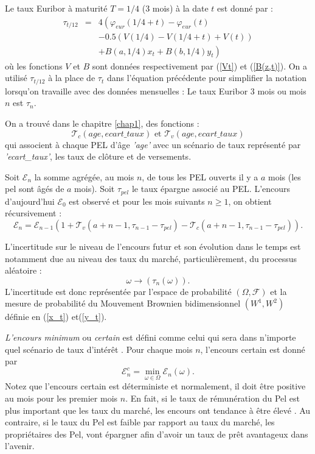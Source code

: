 \documentclass[12pt, a4paper]{book}
\newcommand{\Tc}{\mathcal{T}_c}
\newcommand{\Tv}{\mathcal{T}_v}
\newcommand{\E}{\mathcal{E}}
\begin{document}
Le taux Euribor à maturité $T =1/4$ (3 mois) à la date $t$ est donné par :
\begin{eqnarray}
\tau_{t/12} &=& 4\left( \varphi_{eur}(1/4+t)-\varphi_{eur}(t)\right.\nonumber\\
& &-0.5(V(1/4)-V(1/4+t)+V(t))\nonumber\\
& &\left.+B(a, 1/4)x_t + B(b, 1/4)y_t\right)\label{t_euribor}
\end{eqnarray}
où les fonctions $V$ et $B$ sont données respectivement par (\ref{Vt}) et (\ref{B(z,t)}). On a utilisé $\tau_{t/12}$ à la place de $\tau_t$ dans l'équation précédente pour simplifier la notation lorsqu'on travaille avec des données mensuelles : Le taux Euribor 3 mois ou mois $n$ est $\tau_n$.

On a trouvé dans le chapitre \ref{chap1}, des fonctions :
$$ \Tc(age, ecart\_taux)\mbox{ et }\Tv(age, ecart\_taux)$$
qui associent à chaque PEL d'âge {\it 'age'} avec un scénario de taux représenté par {\it 'ecart\_taux'}, les taux de clôture et de versements.

Soit $\E_n$ la somme agrégée, au mois $n$,  de tous les PEL ouverts il y a $a$ mois (les pel sont âgés de $a$ mois). Soit $\tau_{pel}$ le taux épargne associé au PEL. L'encours d'aujourd'hui $\E_0$ est observé et pour les mois suivants $n\geq 1$, on obtient récursivement :
\begin{equation}\label{En}
\E_n = \E_{n-1}\left( 1 + \Tv(a + n-1,\tau_{n-1}-\tau_{pel})-\Tc(a + n-1,\tau_{n-1}-\tau_{pel}) \right).
\end{equation}


L'incertitude sur le niveau de l'encours futur et son évolution dans le temps est notamment due au niveau des taux du marché, particulièrement, du processus aléatoire :
$$ \omega \rightarrow (\tau_n(\omega)).$$
L'incertitude est donc représentée par l'espace de probabilité $(\Omega,\mathcal{F})$ et la mesure de probabilité du Mouvement Brownien bidimensionnel $(W^1,W^2)$ définie en (\ref{x_t}) et(\ref{y_t}). 

{\it L'encours minimum} ou {\it certain} est défini comme celui qui sera dans n'importe quel scénario de taux d'intérêt \cite{CNC2}. Pour chaque mois $n$, l'encours certain est donné par
\begin{equation}\label{Ec}
\E_n^c = \min_{\omega \in \Omega} \E_n(\omega).
\end{equation}
Notez que l'encours certain est déterministe et normalement, il doit être positive au mois pour les premier mois $n$. En fait, si le taux de rémunération du Pel est plus important que les taux du marché, les encours ont tendance à être élevé . Au contraire, si le taux du Pel est faible par rapport au taux du marché, les propriétaires des Pel, vont épargner afin d'avoir un taux de prêt avantageux dans l'avenir. 
\end{document}
